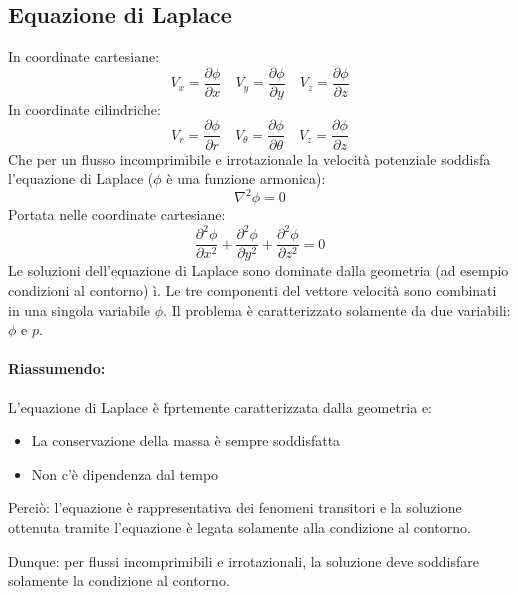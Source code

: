 \subsection{Equazione di Laplace}
In coordinate cartesiane:
\begin{equation}
V_x = \frac{\partial \phi}{\partial x} \quad V_y = \frac{\partial \phi}{\partial y} \quad V_z = \frac{\partial \phi}{\partial z}
\end{equation}
In coordinate cilindriche:
\begin{equation}
V_r = \frac{\partial \phi}{\partial r} \quad V_{\theta} = \frac{\partial \phi}{\partial \theta} \quad V_z = \frac{\partial \phi}{\partial z}
\end{equation}
Che per un flusso incomprimibile e irrotazionale la velocità potenziale soddisfa l'equazione di Laplace ($\phi$ è una funzione armonica): 
\begin{equation}
\nabla^2\phi = 0
\end{equation}
Portata nelle coordinate cartesiane:
\begin{equation}
\frac{\partial^2 \phi}{\partial x^2} + \frac{\partial^2 \phi}{\partial y^2} + \frac{\partial^2 \phi}{\partial z^2} = 0 
\end{equation}
Le soluzioni dell'equazione di Laplace sono dominate dalla geometria (ad esempio condizioni al contorno) ì. Le tre componenti del vettore velocità sono combinati in una singola variabile $\phi$. Il problema è caratterizzato solamente da due variabili: $\phi$ e $p$.

\paragraph{Riassumendo:}
L'equazione di Laplace è fprtemente caratterizzata dalla geometria e:
\begin{itemize}
\item La conservazione della massa è sempre soddisfatta
\item Non c'è dipendenza dal tempo
\end{itemize}
Perciò: l'equazione è rappresentativa dei fenomeni transitori e la soluzione ottenuta tramite l'equazione è legata solamente alla condizione al contorno.

Dunque: per flussi incomprimibili e irrotazionali, la soluzione deve soddisfare solamente la condizione al contorno.

